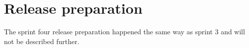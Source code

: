 \section{Release preparation}
The sprint four release preparation happened the same way as sprint 3 and will not be described further. 